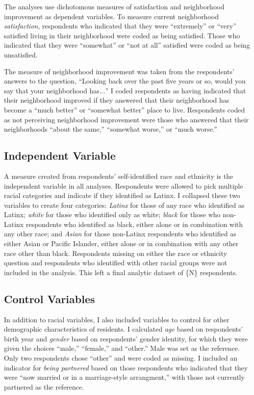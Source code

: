 \documentclass{baderart}
\begin{document}
The analyses use dichotomous measures of satisfaction and neighborhood
improvement as dependent variables. To measure current neighborhood
\emph{satisfaction}, respondents who indicated that they were
``extremely'' or ``very'' satisfied living in their neighborhood were
coded as being satisfied. Those who indicated that they were
``somewhat'' or ``not at all'' satisfied were coded as being
unsatisfied.

The measure of neighborhood improvement was taken from the respondents'
answers to the question, ``Looking back over the past five years or so,
would you say that your neighborhood has\(\ldots\)'' I coded respondents
as having indicated that their neighborhood improved if they answered
that their neighborhood has become a ``much better'' or ``somewhat
better'' place to live. Respondents coded as not perceiving neighborhood
improvement were those who answered that their neighborhoods ``about the
same,'' ``somewhat worse,'' or ``much worse.''

\subsection{Independent Variable}\label{independent-variable}

A measure created from respondents' self-identified race and ethnicity
is the independent variable in all analyses. Respondents were allowed to
pick multiple racial categories and indicate if they identified as
Latinx. I collapsed these two variables to create four categories:
\emph{Latinx} for those of any race who identified as Latinx;
\emph{white} for those who identified only as white; \emph{black} for
those who non-Latinx respondents who identified as black, either alone
or in combination with any other race; and \emph{Asian} for those
non-Latinx respondents who identified as either Asian or Pacific
Islander, either alone or in combination with any other race other than
black. Respondents missing on either the race or ethnicity question and
respondents who identified with other racial groups were not included in
the analysis. This left a final analytic dataset of \{N\} respondents.

\subsection{Control Variables}\label{control-variables}

In addition to racial variables, I also included variables to control
for other demographic characteristics of residents. I calculated
\emph{age} based on respondents' birth year and \emph{gender} based on
respondents' gender identity, for which they were given the choices
``male,'' ``female,'' and ``other.'' Male was set as the reference. Only
two respondents chose ``other'' and were coded as missing. I included an
indicator for \emph{being partnered} based on those respondents who
indicated that they were ``now married or in a marriage-style
arrangment,'' with those not currently partnered as the reference.
\end{document}
